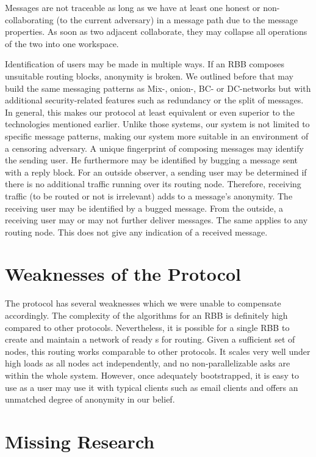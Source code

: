 Messages are not traceable as long as we have at least one honest or non-collaborating (to the current adversary) \VortexNode{} in a message path due to the message properties. As soon as two adjacent \VortexNodes{} collaborate, they may collapse all operations of the two into one workspace.

Identification of \MessageVortex{} users may be made in multiple ways. If an RBB composes unsuitable routing blocks, anonymity is broken. We outlined before that \MessageVortex{} may build the same messaging patterns as Mix-, onion-, BC- or DC-networks but with additional security-related features such as redundancy or the split of messages. In general, this makes our protocol at least equivalent or even superior to the technologies mentioned earlier. Unlike those systems, our system is not limited to specific message patterns, making our system more suitable in an environment of a censoring adversary. A unique fingerprint of composing messages may identify the sending user. He furthermore may be identified by bugging a message sent with a reply block. For an outside observer, a sending user may be determined if there is no additional traffic running over its routing node. Therefore, receiving traffic (to be routed or not is irrelevant) adds to a message's anonymity. The receiving user may be identified by a bugged message. From the outside, a receiving user may or may not further deliver messages. The same applies to any routing node. This does not give any indication of a received message.

\chapter{Weaknesses of the Protocol}
The protocol has several weaknesses which we were unable to compensate accordingly. The complexity of the algorithms for an RBB is definitely high compared to other protocols. Nevertheless, it is possible for a single RBB to create and maintain a network of ready s for routing. Given a sufficient set of nodes, this routing works comparable to other protocols. It scales very well under high loads as all nodes act independently, and no non-parallelizable asks are within the whole system. However, once adequately bootstrapped, it is easy to use as a user may use it with typical clients such as email clients and offers an unmatched degree of anonymity in our belief.

\chapter{Missing Research}
